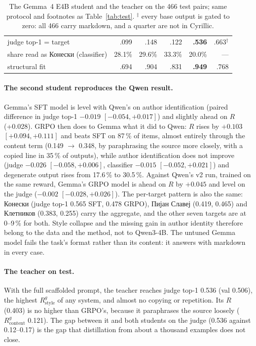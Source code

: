 \documentclass[11pt]{article}
\begin{document}
\begin{table}[ht]
\begin{tabular}{lrrrrr}
\quad judge top-1 = target                  & .099 & .148 & .122 & \textbf{.536} & .663$^\dagger$ \\
\quad share read as Конески (classifier)    & 28.1\% & 29.6\% & 33.3\% & 20.0\% & --- \\
\quad structural fit                        & .694 & .904 & .831 & \textbf{.949} & .768 \\
\bottomrule
\end{tabular}
\caption{The Gemma~4 E4B student and the teacher on the 466 test pairs; same
protocol and footnotes as Table~\ref{tab:test}. $^\ddagger$ every base output
is gated to zero: all 466 carry markdown, and a quarter are not in Cyrillic.}
\label{tab:gemma}
\end{table}

\paragraph{The second student reproduces the Qwen result.} Gemma's SFT model
is level with Qwen's on author identification (paired difference in judge
top-1 $-0.019$ $[-0.054, +0.017]$) and slightly ahead on $R$ (+0.028). GRPO
then does to Gemma what it did to Qwen: $R$ rises by $+0.103$
$[+0.094, +0.111]$ and beats SFT on 87\,\% of items, almost entirely through
the content term (0.149 $\to$ 0.348, by paraphrasing the source more closely,
with a copied line in 35\,\% of outputs), while author identification does not
improve (judge $-0.026$ $[-0.058, +0.006]$, classifier $-0.015$
$[-0.052, +0.021]$) and degenerate output rises from 17.6\,\% to 30.5\,\%.
Against Qwen's v2 run, trained on the same reward, Gemma's GRPO model is ahead
on $R$ by $+0.045$ and level on the judge ($-0.002$ $[-0.028, +0.026]$). The
per-target pattern is also the same: Конески (judge top-1 0.565 SFT, 0.478
GRPO), Пијан Славеј (0.419, 0.465) and Клетников (0.383, 0.255) carry the
aggregate, and the other seven targets are at 0--9\,\% for both. Style
collapse and the missing gain in author identity therefore belong to the data
and the method, not to Qwen3-4B. The untuned Gemma model fails the task's
format rather than its content: it answers with markdown in every case.

\paragraph{The teacher on test.} With the full scaffolded prompt, the teacher
reaches judge top-1 0.536 (val 0.506), the highest $R^{g}_{\mathrm{style}}$ of any system, and
almost no copying or repetition. Its $R$ (0.403) is no higher than GRPO's,
because it paraphrases the source loosely ($R^{g}_{\mathrm{content}}$ 0.121).
The gap between it and both students on the judge (0.536 against
0.12--0.17) is the gap that distillation from about a thousand examples does
not close.
\end{document}
